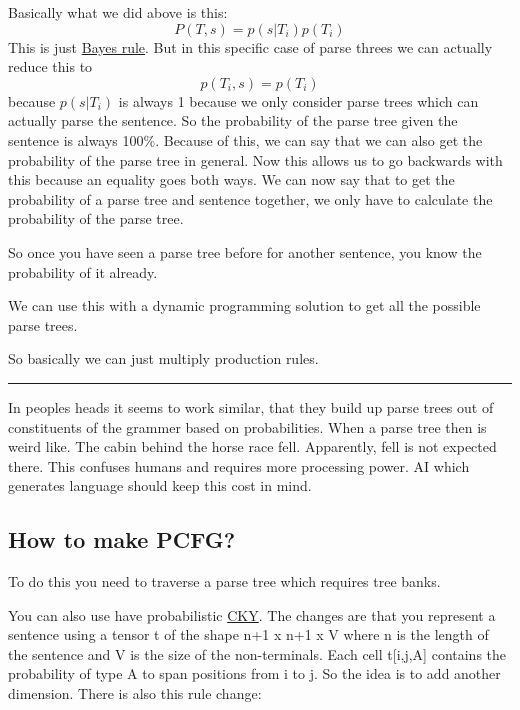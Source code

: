 \documentclass[
  11pt,
  british,
]{article}
\begin{document}
Basically what we did above is this: \[P(T,s) = p(s|T_{i})p(T_{i})\]
This is just
\href{../Classification/Native\%20baiyes/Bayes\%20rule.md}{Bayes rule}.
But in this specific case of parse threes we can actually reduce this to
\[p(T_{i},s) = p(T_i)\] because \(p(s|T_i)\) is always 1 because we only
consider parse trees which can actually parse the sentence. So the
probability of the parse tree given the sentence is always 100\%.
Because of this, we can say that we can also get the probability of the
parse tree in general. Now this allows us to go backwards with this
because an equality goes both ways. We can now say that to get the
probability of a parse tree and sentence together, we only have to
calculate the probability of the parse tree.

So once you have seen a parse tree before for another sentence, you know
the probability of it already.

We can use this with a dynamic programming solution to get all the
possible parse trees.

So basically we can just multiply production rules.

\begin{center}\rule{0.5\linewidth}{0.5pt}\end{center}

In peoples heads it seems to work similar, that they build up parse
trees out of constituents of the grammer based on probabilities. When a
parse tree then is weird like. The cabin behind the horse race fell.
Apparently, fell is not expected there. This confuses humans and
requires more processing power. AI which generates language should keep
this cost in mind.

\hypertarget{how-to-make-pcfg}{%
\subsection{How to make PCFG?}\label{how-to-make-pcfg}}

To do this you need to traverse a parse tree which requires tree banks.

You can also use have probabilistic \href{CKY.md}{CKY}. The changes are
that you represent a sentence using a tensor t of the shape n+1 x n+1 x
V where n is the length of the sentence and V is the size of the
non-terminals. Each cell t{[}i,j,A{]} contains the probability of type A
to span positions from i to j. So the idea is to add another dimension.
There is also this rule change:
\end{document}
